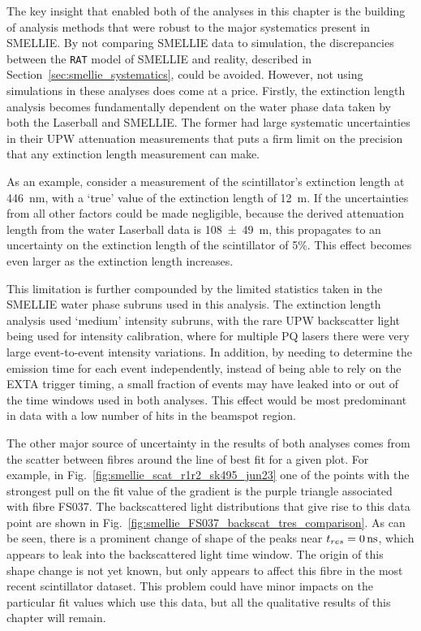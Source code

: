 The key insight that enabled both of the analyses in this chapter is the building of analysis methods that were robust to the major systematics present in SMELLIE. By not comparing SMELLIE data to simulation, the discrepancies between the \texttt{RAT} model of SMELLIE and reality, described in Section~\ref{sec:smellie_systematics}, could be avoided. However, not using simulations in these analyses does come at a price. Firstly, the extinction length analysis becomes fundamentally dependent on the water phase data taken by both the Laserball and SMELLIE. The former had large systematic uncertainties in their UPW attenuation measurements that puts a firm limit on the precision that any extinction length measurement can make.

As an example, consider a measurement of the scintillator's extinction length at \SI{446}{\nm}, with a `true' value of the extinction length of \SI{12}{\m}. If the uncertainties from all other factors could be made negligible, because the derived attenuation length from the water Laserball data is \SI{108(49)}{\m}, this propagates to an uncertainty on the extinction length of the scintillator of 5\%. This effect becomes even larger as the extinction length increases.

This limitation is further compounded by the limited statistics taken in the SMELLIE water phase subruns used in this analysis. The extinction length analysis used `medium' intensity subruns, with the rare UPW backscatter light being used for intensity calibration, where for multiple PQ lasers there were very large event-to-event intensity variations. In addition, by needing to determine the emission time for each event independently, instead of being able to rely on the EXTA trigger timing, a small fraction of events may have leaked into or out of the time windows used in both analyses. This effect would be most predominant in data with a low number of hits in the beamspot region.

The other major source of uncertainty in the results of both analyses comes from the scatter between fibres around the line of best fit for a given plot. For example, in Fig.~\ref{fig:smellie_scat_r1r2_sk495_jun23} one of the points with the strongest pull on the fit value of the gradient is the purple triangle associated with fibre FS037. The backscattered light distributions that give rise to this data point are shown in Fig.~\ref{fig:smellie_FS037_backscat_tres_comparison}. As can be seen, there is a prominent change of shape of the peaks near $\tres{} = \SI{0}{\ns}$, which appears to leak into the backscattered light time window. The origin of this shape change is not yet known, but only appears to affect this fibre in the most recent scintillator dataset. This problem could have minor impacts on the particular fit values which use this data, but all the qualitative results of this chapter will remain.

